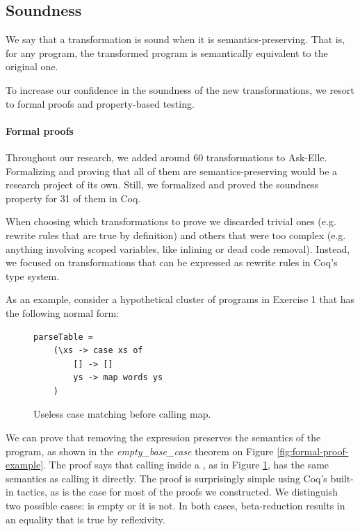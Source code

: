 \subsection{Soundness}

We say that a transformation is sound when it is semantics-preserving. That is, for any program, the transformed program is semantically equivalent to the original one.

To increase our confidence in the soundness of the new transformations, we resort to formal proofs and property-based testing.

\paragraph{Formal proofs}

Throughout our research, we added around 60 transformations to Ask-Elle. Formalizing and proving that all of them are semantics-preserving would be a research project of its own. Still, we formalized and proved the soundness property for 31 of them in Coq.

When choosing which transformations to prove we discarded trivial ones (e.g. rewrite rules that are true by definition) and others that were too complex (e.g. anything involving scoped variables, like inlining or dead code removal). Instead, we focused on transformations that can be expressed as rewrite rules in Coq's type system.

As an example, consider a hypothetical cluster of programs in Exercise 1 that has the following normal form:

\begin{figure}[H]
\centering
\begin{verbatim}
parseTable =
    (\xs -> case xs of
        [] -> []
        ys -> map words ys
    )
\end{verbatim}
\caption{Useless case matching before calling map.}
\label{fig:method-bad-style-map}
\end{figure}

We can prove that removing the  expression preserves the semantics of the program, as shown in the \emph{empty\_base\_case} theorem on Figure \ref{fig:formal-proof-example}. The proof says that calling  inside a , as in Figure \ref{fig:method-bad-style-map}, has the same semantics as calling it directly. The proof is surprisingly simple using Coq's built-in tactics, as is the case for most of the proofs we constructed. We distinguish two possible cases:  is empty or it is not. In both cases, beta-reduction results in an equality that is true by reflexivity.

